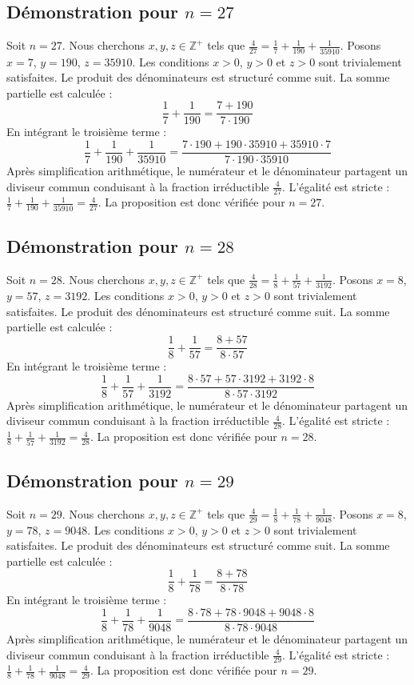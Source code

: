 \documentclass[11pt,a4paper]{article}
\begin{document}
\subsection{Démonstration pour $n = 27$}
Soit $n = 27$. Nous cherchons $x, y, z \in \mathbb{Z}^{+}$ tels que $\frac{4}{27} = \frac{1}{7} + \frac{1}{190} + \frac{1}{35910}$.
Posons $x = 7$, $y = 190$, $z = 35910$.
Les conditions $x > 0$, $y > 0$ et $z > 0$ sont trivialement satisfaites.
Le produit des dénominateurs est structuré comme suit. La somme partielle est calculée :
$$ \frac{1}{7} + \frac{1}{190} = \frac{7+190}{7 \cdot 190} $$
En intégrant le troisième terme :
$$ \frac{1}{7} + \frac{1}{190} + \frac{1}{35910} = \frac{7 \cdot 190 + 190 \cdot 35910 + 35910 \cdot 7}{7 \cdot 190 \cdot 35910} $$
Après simplification arithmétique, le numérateur et le dénominateur partagent un diviseur commun conduisant à la fraction irréductible $\frac{4}{27}$.
L'égalité est stricte : $\frac{1}{7} + \frac{1}{190} + \frac{1}{35910} = \frac{4}{27}$.
La proposition est donc vérifiée pour $n = 27$.
\subsection{Démonstration pour $n = 28$}
Soit $n = 28$. Nous cherchons $x, y, z \in \mathbb{Z}^{+}$ tels que $\frac{4}{28} = \frac{1}{8} + \frac{1}{57} + \frac{1}{3192}$.
Posons $x = 8$, $y = 57$, $z = 3192$.
Les conditions $x > 0$, $y > 0$ et $z > 0$ sont trivialement satisfaites.
Le produit des dénominateurs est structuré comme suit. La somme partielle est calculée :
$$ \frac{1}{8} + \frac{1}{57} = \frac{8+57}{8 \cdot 57} $$
En intégrant le troisième terme :
$$ \frac{1}{8} + \frac{1}{57} + \frac{1}{3192} = \frac{8 \cdot 57 + 57 \cdot 3192 + 3192 \cdot 8}{8 \cdot 57 \cdot 3192} $$
Après simplification arithmétique, le numérateur et le dénominateur partagent un diviseur commun conduisant à la fraction irréductible $\frac{4}{28}$.
L'égalité est stricte : $\frac{1}{8} + \frac{1}{57} + \frac{1}{3192} = \frac{4}{28}$.
La proposition est donc vérifiée pour $n = 28$.
\subsection{Démonstration pour $n = 29$}
Soit $n = 29$. Nous cherchons $x, y, z \in \mathbb{Z}^{+}$ tels que $\frac{4}{29} = \frac{1}{8} + \frac{1}{78} + \frac{1}{9048}$.
Posons $x = 8$, $y = 78$, $z = 9048$.
Les conditions $x > 0$, $y > 0$ et $z > 0$ sont trivialement satisfaites.
Le produit des dénominateurs est structuré comme suit. La somme partielle est calculée :
$$ \frac{1}{8} + \frac{1}{78} = \frac{8+78}{8 \cdot 78} $$
En intégrant le troisième terme :
$$ \frac{1}{8} + \frac{1}{78} + \frac{1}{9048} = \frac{8 \cdot 78 + 78 \cdot 9048 + 9048 \cdot 8}{8 \cdot 78 \cdot 9048} $$
Après simplification arithmétique, le numérateur et le dénominateur partagent un diviseur commun conduisant à la fraction irréductible $\frac{4}{29}$.
L'égalité est stricte : $\frac{1}{8} + \frac{1}{78} + \frac{1}{9048} = \frac{4}{29}$.
La proposition est donc vérifiée pour $n = 29$.
\end{document}
